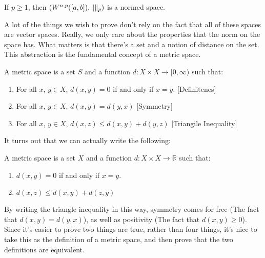         \begin{theorem}
            If $p\geq{1}$, then
            $(W^{n,p}([a,b]),\lVert\rVert_{p})$ is a
            normed space.
        \end{theorem}
        A lot of the things we wish to
        prove don't rely on the fact that all of these
        spaces are vector spaces. Really, we only care about
        the properties that the norm on the space has.
        What matters is that there's a set and a notion
        of distance on the set. This abstraction is the
        fundamental concept of a metric space.
        \begin{definition}
            A metric space is a set $S$ and a function
            $d:{X}\times{X}\rightarrow[0,\infty)$ such that:
            \begin{enumerate}
                \item For all $x$, $y\in{X}$, $d(x,y)=0$
                      if and only if $x=y$.
                      \hfill[Definitenes]
                \item For all $x$, $y\in{X}$,
                      $d(x,y)=d(y,x)$
                      \hfill[Symmetry]
                \item For all $x$, $y\in{X}$,
                      $d(x,z)\leq{d(x,y)+d(y,z)}$
                      \hfill[Triangile Inequality]
            \end{enumerate}
        \end{definition}
        It turns out
        that we can actually write the following:
        \begin{definition}
            A metric space is a set $X$ and a function
            $d:{X}\times{X}\rightarrow\mathbb{R}$
            such that:
            \begin{enumerate}
                \item $d(x,y)=0$ if and only if
                      $x=y$.
                \item $d(x,z)\leq{d(x,y)+d(z,y)}$
            \end{enumerate}
        \end{definition}
        By writing the triangle inequality in this
        way, symmetry comes for free
        (The fact that $d(x,y)=d(y,x)$), as well
        as positivity (The fact that $d(x,y)\geq{0}$).
        Since it's easier to prove two things are
        true, rather than four things, it's nice to
        take this as the definition of a metric space,
        and then prove that the two definitions are
        equivalent.
